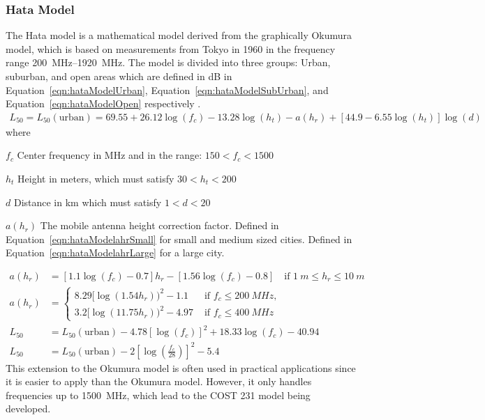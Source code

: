 \subsubsection{Hata Model}
The Hata model is a mathematical model derived from the graphically Okumura model, which is based on measurements from Tokyo in 1960 in the frequency range \SIrange{200}{1920}{MHz}. The model is divided into three groups: Urban, suburban, and open areas which are defined in dB in Equation~\ref{eqn:hataModelUrban}, Equation~\ref{eqn:hataModelSubUrban}, and Equation~\ref{eqn:hataModelOpen} respectively \cite{Seybold2005introduction}.
\begin{align} 
    \label{eqn:hataModelUrban}
    L_{50} = L_{50}(\text{urban}) = 69.55+26.12 \log(f_c) - 13.28 \log(h_t) -a(h_r) + [44.9-6.55 \log(h_t)] \log(d)
\end{align} 
where
\begin{where}
\item [$f_{c}$] Center frequency in \si{MHz} and in the range: $150 < f_c < 1500$
\item [$h_t$] Height in meters, which must satisfy $30 < h_t < 200$
\item [$d$] Distance in km which must satisfy $1 < d < 20$
\item [$a(h_r)$] The mobile antenna height correction factor. Defined in Equation~\ref{eqn:hataModelahrSmall} \cite{Seybold2005introduction} for small and medium sized cities. Defined in Equation~\ref{eqn:hataModelahrLarge} \cite{Seybold2005introduction} for a large city. 
\end{where}
\begin{align} 
\label{eqn:hataModelahrSmall}
a(h_r) &= [1.1 \log(f_c)-0.7]h_r - [1.56 \log(f_c)-0.8]\quad\text{if } \SI{1}{m} \leq h_r \leq \SI{10}{m} \\
\label{eqn:hataModelahrLarge}
a(h_r) &= 
  \begin{cases}
    8.29[\log(1.54 h_r))^2 -1.1 & \text{ if } f_c \leq \SI{200}{MHz}, \\
    3.2[\log(11.75 h_r))^2 -4.97 & \text{ if } f_c \leq \SI{400}{MHz} 
  \end{cases}\\
\label{eqn:hataModelSubUrban}
L_{50} &= L_{50}(\text{urban})-4.78[\log(f_c)]^2 + 18.33 \log(f_c) - 40.94 \\
\label{eqn:hataModelOpen}
L_{50} &= L_{50}(\text{urban})-2 \left[\log\left( \frac{f_c}{28} \right) \right]^2 -5.4 
\end{align} 
This extension to the Okumura model is often used in practical applications since it is easier to apply than the Okumura model. However, it only handles frequencies up to \SI{1500}{MHz}, which lead to the COST 231 model being developed. 

